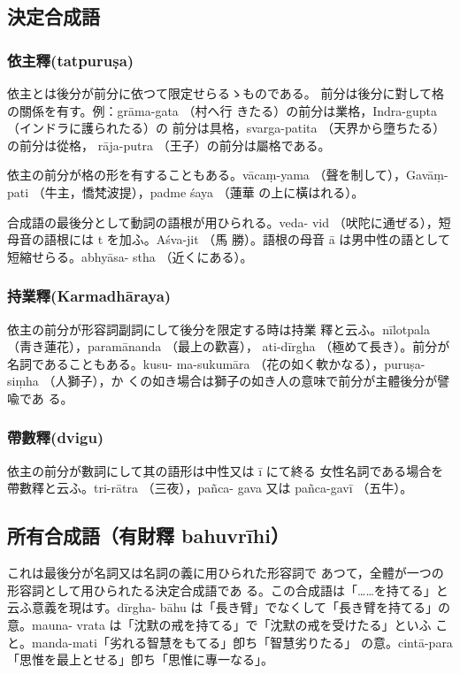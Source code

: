 \subsection{決定合成語}
\subsubsection{依主釋(tatpuruṣa)}
\numberParagraph
依主とは後分が前分に依つて限定せらるゝものである。
前分は後分に對して格の關係を有す。例：grāma-gata （村へ行
きたる）の前分は業格，Indra-gupta （インドラに護られたる）の
前分は具格，svarga-patita （天界から墮ちたる）の前分は從格，
rāja-putra （王子）の前分は屬格である。

\numberParagraph
依主の前分が格の形を有することもある。vācaṃ-yama
（聲を制して），Gavāṃ-pati （牛主，憍梵波提），padme śaya （蓮華
の上に橫はれる）。

\numberParagraph
合成語の最後分として動詞の語根が用ひられる。veda-%
vid （吠陀に通ぜる），短母音の語根には t を加ふ。Aśva-jit （馬
勝）。語根の母音 ā は男中性の語として短縮せらる。abhyāsa-%
stha （近くにある）。

\subsubsection{持業釋(Karmadhāraya)}
\numberParagraph
依主の前分が形容詞副詞にして後分を限定する時は持業
釋と云ふ。nīlotpala （靑き蓮花），paramānanda （最上の歡喜），
ati-dīrgha （極めて長き）。前分が名詞であることもある。kusu-%
ma-sukumāra （花の如く軟かなる），puruṣa-siṃha （人獅子），か
くの如き場合は獅子の如き人の意味で前分が主體後分が譬喩であ
る。

\subsubsection{帶數釋(dvigu)}
\numberParagraph
依主の前分が數詞にして其の語形は中性又は ī にて終る
女性名詞である場合を帶數釋と云ふ。tri-rātra （三夜），pañca-%
gava 又は pañca-gavī （五牛）。

\subsection{所有合成語（有財釋 bahuvrīhi）}
\numberParagraph
これは最後分が名詞又は名詞の義に用ひられた形容詞で
あつて，全體が一つの形容詞として用ひられたる決定合成語であ
る。この合成語は「……を持てる」と云ふ意義を現はす。dīrgha-%
bāhu は「長き臂」でなくして「長き臂を持てる」の意。mauna-%
vrata は「沈默の戒を持てる」で「沈默の戒を受けたる」といふ
こと。manda-mati「劣れる智慧をもてる」卽ち「智慧劣りたる」
の意。cintā-para「思惟を最上とせる」卽ち「思惟に專一なる」。

